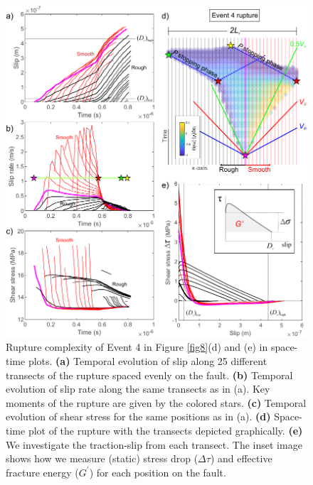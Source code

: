 \documentclass[preprint,1p, 10pt,authoryear]{elsarticle}
\begin{document}
\begin{figure}
	\centering
	\includegraphics{FIG9_revised.pdf} 
	\caption{Rupture complexity of Event 4 in Figure \ref{fig8}(d) and (e) in space-time plots.  \textbf{(a)} Temporal evolution of slip along 25 different transects of the rupture spaced evenly on the fault. \textbf{(b)} Temporal evolution of slip rate along the same transects as in (a). Key moments of the rupture are given by the colored stars. \textbf{(c)} Temporal evolution of shear stress for the same positions as in (a). \textbf{(d)} Space-time plot of the rupture with the transects depicted graphically. \textbf{(e)} We investigate the traction-slip from each transect. The inset image shows how we measure (static) stress drop ($\Delta\tau$) and effective fracture energy ($G^{'}$) for each position on the fault.}
	\label{fig9}
\end{figure}
\end{document}
